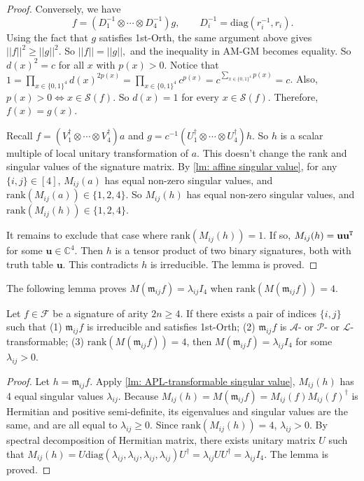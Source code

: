 \begin{proof}
    Conversely, we have 
    \begin{equation}\label{eq: f = Dg}
        f=(D_1^{-1}\otimes \cdots \otimes D_4^{-1})g,\qquad D_i^{-1}=\mathrm{diag}(r_i^{-1},r_i).
    \end{equation}
    Using the fact that $g$ satisfies {\sc 1st-Orth}, the same argument above gives $||f||^2\ge ||g||^2.$
    So $||f||=||g||,$ and the inequality in AM-GM becomes equality.
    So $d(x)^2=c$ for all $x$ with $p(x)>0$.
    Notice that $1=\prod_{x\in\{0,1\}^4}d(x)^{2p(x)}=\prod_{x\in\{0,1\}^4}c^{p(x)}=c^{\sum_{x\in\{0,1\}^4}p(x)}=c$.
    Also, $p(x)>0\iff x\in \mathscr{S}(f)$.
    So $d(x)=1$ for every $x\in \mathscr{S}(f).$
    Therefore, $f(x)=g(x)$.

    Recall $f=(V_1^\dagger\otimes \cdots\otimes V_4^\dagger)a$ and $g=c^{-1}(U_1^\dagger\otimes \cdots \otimes U_4^\dagger)h$.
    So $h$ is a scalar multiple of local unitary transformation of \(a\). 
    This doesn't change the rank and singular values of the signature matrix.
    By \cref{lm: affine singular value}, for any $\{i,j\}\in [4]$, $M_{ij}(a)$ has equal non-zero singular values, and $\mathrm{rank}(M_{ij}(a))\in\{1,2,4\}.$
    So $M_{ij}(h)$ has equal non-zero singular values, and $\mathrm{rank}(M_{ij}(h))\in\{1,2,4\}.$

    It remains to exclude that case where $\mathrm{rank}(M_{ij}(h))=1.$
    If so, $M_{ij}(h)=\mathbf{uu^{\tt T}}$ for some $\mathbf{u}\in \mathbb{C}^4.$
    Then $h$ is a tensor product of two binary signatures, both with truth table $\mathbf{u}.$
    This contradicts $h$ is irreducible.
    The lemma is proved.
\end{proof}

The following lemma proves $M(\mathfrak{m}_{ij}f)=\lambda_{ij}I_4$ when $\mathrm{rank}(M(\mathfrak{m}_{ij}f))=4.$

\begin{lemma}\label{lm: APL-trans rank 4}
    Let $f\in \mathcal{F}$ be a signature of arity $2n\ge 4$.
    If there exists a pair of indices $\{i,j\}$ such that (1) $\mathfrak{m}_{ij}f$ is irreducible and satisfies {\sc 1st-Orth}; (2) $\mathfrak{m}_{ij}f$ is $\mathscr{A}$- or $\mathscr{P}$- or $\mathscr{L}$-transformable; (3) $\mathrm{rank}(M(\mathfrak{m}_{ij}f))=4$, then $M(\mathfrak{m}_{ij}f)=\lambda_{ij}I_4$ for some $\lambda_{ij}>0.$
\end{lemma}
\begin{proof}
    Let $h=\mathfrak{m}_{ij}f$.
    Apply \cref{lm: APL-transformable singular value}, $M_{ij}(h)$ has 4 equal singular values $\lambda_{ij}$.
    Because $M_{ij}(h)=M(\mathfrak{m}_{ij}f)=M_{ij}(f)M_{ij}(f)^\dagger$ is Hermitian and positive semi-definite, its eigenvalues and singular values are the same, and are all equal to $\lambda_{ij}\ge 0$.
    Since $\mathrm{rank}(M_{ij}(h))=4$, $\lambda_{ij}>0.$
    By spectral decomposition of Hermitian matrix, there exists unitary matrix $U$ such that  $M_{ij}(h)=U\mathrm{diag}(\lambda_{ij},\lambda_{ij},\lambda_{ij},\lambda_{ij})U^{\dagger}=\lambda_{ij}UU^\dagger=\lambda_{ij}I_4$.
    The lemma is proved.
\end{proof}

